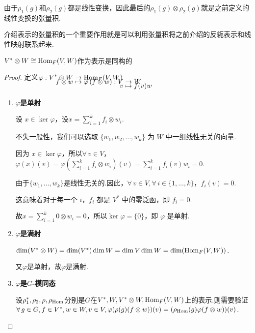 由于$\rho_1(g)$和$\rho_2(g)$都是线性变换，因此最后的$\rho_1(g)\otimes\rho_2(g)$就是之前定义的线性变换的张量积.\par
介绍表示的张量积的一个重要作用就是可以利用张量积将之前介绍的反轭表示和线性映射联系起来.
\begin{theorem}[]
    $V^*\otimes W\cong \operatorname{Hom}_F(V,W)$作为表示是同构的
\end{theorem}
\begin{proof}
    定义$\setjot[-6]\begin{aligned}[t]
        \varphi:V^*\otimes W&\to \Hom_F(V,W) \\
        f\otimes w&\mapsto \varphi\left(f\otimes w\right):\setjot[-2]\begin{aligned}[t]
            V&\to W\\
            v&\mapsto f(v)w
        \end{aligned}
    \end{aligned}$
    \begin{enumerate}[label=(\roman*),leftmargin=3.5em]
        \item \textbf{\boldmath $\varphi$是单射}\par
        设 $x \in \ker\varphi$，设$x = \sum_{i=1}^k f_i \otimes w_i$.\par
        不失一般性，我们可以选取 $\{w_1, w_2, \dots, w_k\}$ 为 $W$ 中一组线性无关的向量.\par
        因为 $x \in \ker\varphi$，所以$\forall\,v \in V$，$\varphi(x)(v) = \varphi\left(\sum_{i=1}^k f_i \otimes w_i\right)(v) = \sum_{i=1}^k f_i(v)w_i = 0$.\par
        由于$\{w_1, \dots, w_k\}$是线性无关的.因此，$\forall\,v \in V,\forall\,i \in \{1, \dots, k\}$，$f_i(v) = 0$.\par
        这意味着对于每一个 $i$，$f_i$ 都是 $V^*$ 中的零泛函，即 $f_i = 0$.\par
        故$x = \sum_{i=1}^k 0 \otimes w_i = 0$，所以$\ker\varphi = \{0\}$，即 $\varphi$ 是单射.
        \item \textbf{\boldmath $\varphi$是满射}\par
        $\dim(V^*\otimes W)=\dim(V^*)\dim W=\dim V\dim W =\dim(\operatorname{Hom}_F(V,W))$.\par
        又$\varphi$是单射，故$\varphi$是满射.
        \item \textbf{\boldmath $\varphi$是$G$-模同态}\par
        设$\rho_1^*,\rho_2,\rho,\rho_{\operatorname{Hom}}$分别是$G$在$V^*,W,V^*\otimes W,\operatorname{Hom}_F(V,W)$上的表示.则需要验证$\forall\, g\in G,f\in V^*,w\in W,v\in V,\varphi(\rho(g)(f \otimes w))(v) = (\rho_{\operatorname{Hom}}(g)\varphi(f \otimes w))(v)$.\par

\end{enumerate}
\end{proof}
